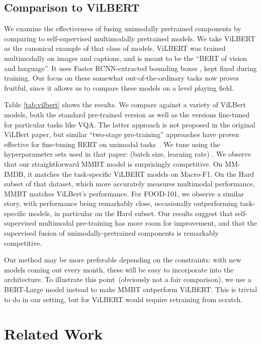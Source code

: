 \documentclass[11pt,a4paper]{article}
\begin{document}
\subsection{Comparison to ViLBERT}

We examine the effectiveness of fusing unimodally pretrained components by comparing to self-supervised multimodally pretrained models. We take ViLBERT \cite{Lu:2019vilbert} as the canonical example of that class of models. ViLBERT was trained multimodally on images and captions, and is meant to be the ``BERT of vision and language''. It uses Faster RCNN-extracted bounding boxes
, kept fixed during training. Our focus on these somewhat out-of-the-ordinary tasks now proves fruitful, since it allows us to compare these models on a level playing field.

Table \ref{tab:vilbert} shows the results. We compare against a variety of ViLBert models, both the standard pre-trained version as well as the versions fine-tuned for particular tasks like VQA. The latter approach is not proposed in the original ViLBert paper, but similar ``two-stage pre-training'' approaches have proven effective for fine-tuning BERT on unimodal tasks~\cite{Phang2018sentence}.
We tune using the hyperparameter sets used in that paper: (batch size, learning rate) .
We observe that our straightforward MMBT model is surprisingly competitive. On MM-IMDB, it matches the task-specific ViLBERT models on Macro-F1. On the Hard subset of that dataset, which more accurately measures multimodal performance, MMBT matches ViLBert's performance. For FOOD-101, we observe a similar story, with performance being remarkably close, occasionally outperforming task-specific models, in particular on the Hard subset. Our results suggest that self-supervised multimodal pre-training has more room for improvement, and that the supervised fusion of unimodally-pretrained components is remarkably competitive.

Our method may be more preferable depending on the constraints: with new models coming out every month, these will be easy to incorporate into the architecture. To illustrate this point~(obviously not a fair comparison), we use a BERT-Large model instead to make MMBT outperform ViLBERT. This is trivial to do in our setting, but for ViLBERT would require retraining from scratch.

\section{Related Work}
\end{document}

